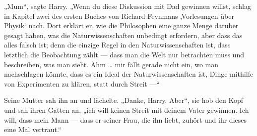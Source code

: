 „Mum“, sagte Harry.
„Wenn du diese Diskussion mit Dad gewinnen willst, schlag in Kapitel zwei des ersten Buches von Richard Feynmans ‚Vorlesungen über Physik‘ nach. Dort erklärt er, wie die Philosophen eine ganze Menge darüber gesagt haben, was die Naturwissenschaften unbedingt erfordern, aber dass das alles falsch ist; denn die einzige Regel in den Naturwissenschaften ist, dass letztlich die Beobachtung zählt — dass man die Welt nur betrachten muss und beschreiben, was man sieht. Ähm … mir fällt gerade nicht ein, wo man nachschlagen könnte, dass es ein Ideal der Naturwissenschaften ist, Dinge mithilfe von Experimenten zu klären, statt durch Streit —“ %

Seine Mutter sah ihn an und lächelte.
„Danke, Harry. Aber“, sie hob den Kopf und sah ihren Gatten an, „ich will keinen Streit mit deinem Vater gewinnen. Ich will, dass mein Mann — dass er seiner Frau, die ihn liebt, zuhört und ihr dieses eine Mal vertraut.“

